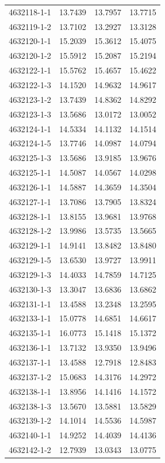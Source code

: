 \begin{longtable}{lrrr}
4632118-1-1 & 13.7439 & 13.7957 & 13.7715 \\
4632119-1-2 & 13.7102 & 13.2927 & 13.3128 \\
4632120-1-1 & 15.2039 & 15.3612 & 15.4075 \\
4632120-1-2 & 15.5912 & 15.2087 & 15.2194 \\
4632122-1-1 & 15.5762 & 15.4657 & 15.4622 \\
4632122-1-3 & 14.1520 & 14.9632 & 14.9617 \\
4632123-1-2 & 13.7439 & 14.8362 & 14.8292 \\
4632123-1-3 & 13.5686 & 13.0172 & 13.0052 \\
4632124-1-1 & 14.5334 & 14.1132 & 14.1514 \\
4632124-1-5 & 13.7746 & 14.0987 & 14.0794 \\
4632125-1-3 & 13.5686 & 13.9185 & 13.9676 \\
4632125-1-1 & 14.5087 & 14.0567 & 14.0298 \\
4632126-1-1 & 14.5887 & 14.3659 & 14.3504 \\
4632127-1-1 & 13.7086 & 13.7905 & 13.8324 \\
4632128-1-1 & 13.8155 & 13.9681 & 13.9768 \\
4632128-1-2 & 13.9986 & 13.5735 & 13.5665 \\
4632129-1-1 & 14.9141 & 13.8482 & 13.8480 \\
4632129-1-5 & 13.6530 & 13.9727 & 13.9911 \\
4632129-1-3 & 14.4033 & 14.7859 & 14.7125 \\
4632130-1-3 & 13.3047 & 13.6836 & 13.6862 \\
4632131-1-1 & 13.4588 & 13.2348 & 13.2595 \\
4632133-1-1 & 15.0778 & 14.6851 & 14.6617 \\
4632135-1-1 & 16.0773 & 15.1418 & 15.1372 \\
4632136-1-1 & 13.7132 & 13.9350 & 13.9496 \\
4632137-1-1 & 13.4588 & 12.7918 & 12.8483 \\
4632137-1-2 & 15.0683 & 14.3176 & 14.2972 \\
4632138-1-1 & 13.8956 & 14.1416 & 14.1572 \\
4632138-1-3 & 13.5670 & 13.5881 & 13.5829 \\
4632139-1-2 & 14.1014 & 14.5536 & 14.5987 \\
4632140-1-1 & 14.9252 & 14.4039 & 14.4136 \\
4632142-1-2 & 12.7939 & 13.0343 & 13.0775 \\

\end{longtable}
